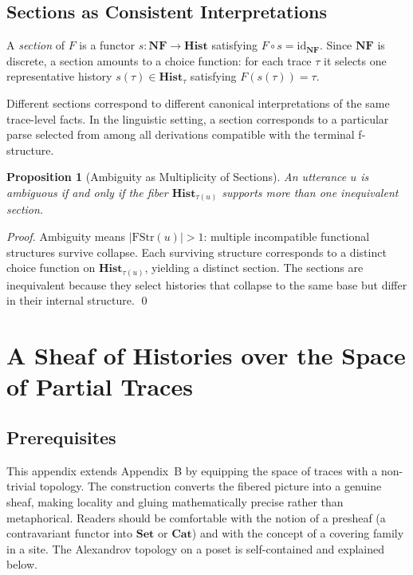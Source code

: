 \documentclass[12pt, oneside]{amsbook}
\theoremstyle{plain}
\newtheorem{proposition}[theorem]{Proposition}
\theoremstyle{definition}
\theoremstyle{remark}
\newcommand{\FStr}{\mathrm{FStr}}
\begin{document}
\section{Sections as Consistent Interpretations}

A \emph{section} of $F$ is a functor $s : \mathbf{NF} \to \mathbf{Hist}$
satisfying $F \circ s = \mathrm{id}_{\mathbf{NF}}$. Since $\mathbf{NF}$ is
discrete, a section amounts to a choice function: for each trace $\tau$ it
selects one representative history $s(\tau) \in \mathbf{Hist}_\tau$ satisfying
$F(s(\tau)) = \tau$.

Different sections correspond to different canonical interpretations of the
same trace-level facts. In the linguistic setting, a section corresponds to a
particular parse selected from among all derivations compatible with the
terminal f-structure.

\begin{proposition}[Ambiguity as Multiplicity of Sections]
\label{prop:ambiguity-mult}
An utterance $u$ is ambiguous if and only if the fiber $\mathbf{Hist}_{\tau(u)}$
supports more than one inequivalent section.
\end{proposition}

\begin{proof}
Ambiguity means $|\FStr(u)| > 1$: multiple incompatible functional structures
survive collapse. Each surviving structure corresponds to a distinct choice
function on $\mathbf{Hist}_{\tau(u)}$, yielding a distinct section. The
sections are inequivalent because they select histories that collapse to
the same base but differ in their internal structure. \qed
\end{proof}

\chapter{A Sheaf of Histories over the Space of Partial Traces}
\label{app:sheaf}

\section{Prerequisites}

This appendix extends Appendix~B by equipping the space of traces with a
non-trivial topology. The construction converts the fibered picture into a
genuine sheaf, making locality and gluing mathematically precise rather
than metaphorical. Readers should be comfortable with the notion of a
presheaf (a contravariant functor into $\mathbf{Set}$ or $\mathbf{Cat}$)
and with the concept of a covering family in a site. The Alexandrov topology
on a poset is self-contained and explained below.
\end{document}
